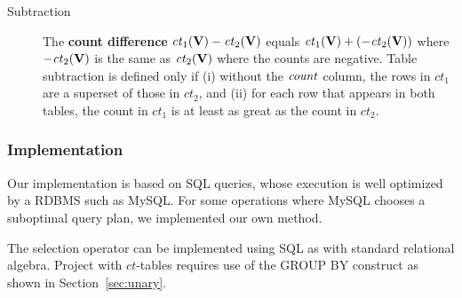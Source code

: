 \documentclass{vldb}
\newcommand{\ct}{\mathit{ct}}
\begin{document}
\begin{description}
\item[Subtraction] %
The \textbf{count difference} $\ct_{1}(\set{V}) - \ct_{2}(\set{V})$ equals $\ct_{1}(\set{V}) + (- \ct_{2}(\set{V}))$ where $- \ct_{2}(\set{V})$ is the same as $\ct_{2}(\set{V})$ where the counts are negative. 
Table subtraction is defined only if (i) without the $\it{count}$ column, the rows in $\ct_{1}$ are a superset of those in $\ct_{2}$, and (ii) for each row that appears in both tables, the count in $\ct_{1}$ is at least as great as the count in $\ct_{2}$.


\end{description}


\subsubsection{Implementation}\label{sec:imp}
Our implementation is based on SQL queries, whose execution is well optimized by a RDBMS such as MySQL.   
For some operations where MySQL chooses a suboptimal query plan, we implemented our own method.

The selection operator can be implemented  using SQL as with standard relational algebra. 
Project with $\ct$-tables requires use of the GROUP BY construct as shown in Section~\ref{sec:unary}. 
\end{document}
